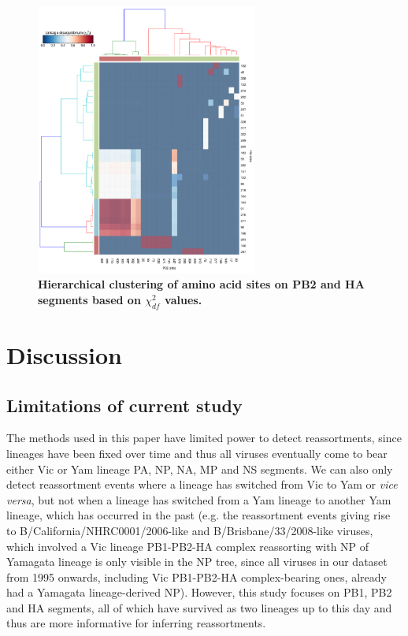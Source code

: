 \documentclass[11pt,oneside,letterpaper]{article}
\begin{document}
\begin{figure}[h]
	\centering	
	\includegraphics[width=0.65\textwidth]	{figures/Chi_PB2_HA.png}
	\caption{\textbf{Hierarchical clustering of amino acid sites on PB2 and HA segments based on $\chi^{2}_{df}$ values.}}
	\label{ChiPB2HA}
\end{figure}


\section*{Discussion}

\subsection*{Limitations of current study}
The methods used in this paper have limited power to detect reassortments, since lineages have been fixed over time and thus all viruses eventually come to bear either Vic or Yam lineage PA, NP, NA, MP and NS segments.
We can also only detect reassortment events where a lineage has switched from Vic to Yam or \textit{vice versa}, but not when a lineage has switched from a Yam lineage to another Yam lineage, which has occurred in the past (e.g. the reassortment events giving rise to B/California/NHRC0001/2006-like and B/Brisbane/33/2008-like viruses, which involved a Vic lineage PB1-PB2-HA complex reassorting with NP of Yamagata lineage is only visible in the NP tree, since all viruses in our dataset from 1995 onwards, including Vic PB1-PB2-HA complex-bearing ones, already had a Yamagata lineage-derived NP).
However, this study focuses on PB1, PB2 and HA segments, all of which have survived as two lineages up to this day and thus are more informative for inferring reassortments.
\end{document}
